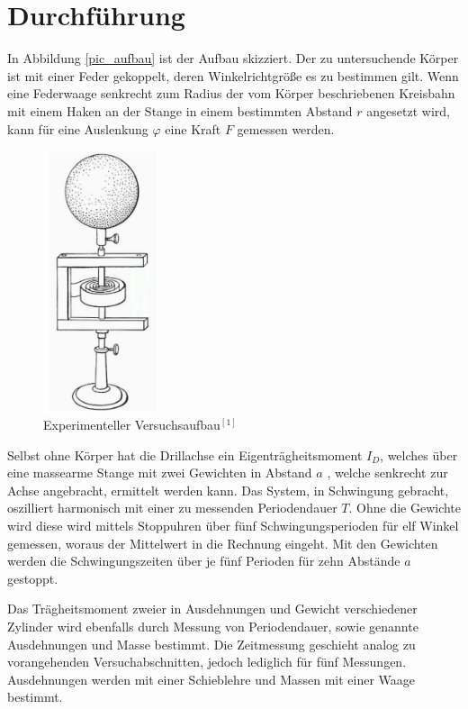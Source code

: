 \section{Durchführung}
In Abbildung \eqref{pic_aufbau} ist der Aufbau skizziert. Der zu untersuchende Körper ist mit einer Feder gekoppelt, deren Winkelrichtgröße
es zu bestimmen gilt. Wenn eine Federwaage senkrecht zum Radius der vom Körper beschriebenen Kreisbahn mit einem Haken an der Stange
in einem bestimmten Abstand $r$ angesetzt wird, kann für eine Auslenkung $\varphi$ eine Kraft $F$ gemessen werden. 
\begin{figure}[H]
 \includegraphics[width=0.3\textwidth]{pics/aufbau.png}
 \caption{Experimenteller Versuchsaufbau$^{[1]}$}
 \label{pic_aufbau}
\end{figure}

Selbst ohne Körper hat die Drillachse ein Eigenträgheitsmoment $I_D$, welches über eine massearme Stange mit zwei Gewichten in Abstand $a$
, welche senkrecht zur Achse angebracht, ermittelt werden kann. Das System, in Schwingung gebracht, oszilliert harmonisch mit einer 
zu messenden Periodendauer $T$. Ohne die Gewichte wird diese wird mittels Stoppuhren über fünf Schwingungsperioden für elf Winkel 
gemessen, woraus der  Mittelwert in die Rechnung eingeht. Mit den Gewichten werden die Schwingungszeiten über je fünf Perioden für 
zehn Abstände $a$ gestoppt. 

Das Trägheitsmoment zweier in Ausdehnungen und Gewicht verschiedener Zylinder wird ebenfalls durch Messung von Periodendauer, sowie 
genannte Ausdehnungen und Masse bestimmt. Die Zeitmessung geschieht analog zu vorangehenden Versuchabschnitten, jedoch lediglich für
fünf Messungen. Ausdehnungen werden mit einer Schieblehre und Massen mit einer Waage bestimmt.

